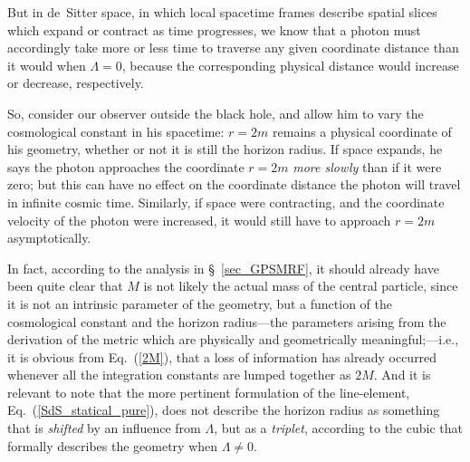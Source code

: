 But in de~Sitter space, in which local spacetime frames describe spatial slices which expand or contract as time progresses, we know that a photon must accordingly take more or less time to traverse any given coordinate distance than it would when $\Lambda=0$, because the corresponding physical distance would increase or decrease, respectively.

So, consider our observer outside the black hole, and allow him to vary the cosmological constant in his spacetime: $r=2m$ remains a physical coordinate of his geometry, whether or not it is still the horizon radius. If space expands, he says the photon approaches the coordinate $r=2m$ \textit{more slowly} than if it were zero; but this can have no effect on the coordinate distance the photon will travel in infinite cosmic time. Similarly, if space were contracting, and the coordinate velocity of the photon were increased, it would still have to approach $r=2m$ asymptotically.  

In fact, according to the analysis in \S~\ref{sec_GPSMRF}, it should already have been quite clear that $M$ is not likely the actual mass of the central particle, since it is not an intrinsic parameter of the geometry, but a function of the cosmological constant and the horizon radius---the parameters arising from the derivation of the metric which are physically and geometrically meaningful;---i.e., it is obvious from Eq.~(\ref{2M}), that a loss of information has already occurred whenever all the integration constants are lumped together as $2M$. And it is relevant to note that the more pertinent formulation of the line-element, Eq.~(\ref{SdS_statical_pure}), does not describe the horizon radius as something that is \textit{shifted} by an influence from $\Lambda$, but as a \textit{triplet}, according to the cubic that formally describes the geometry when $\Lambda\neq0$.


